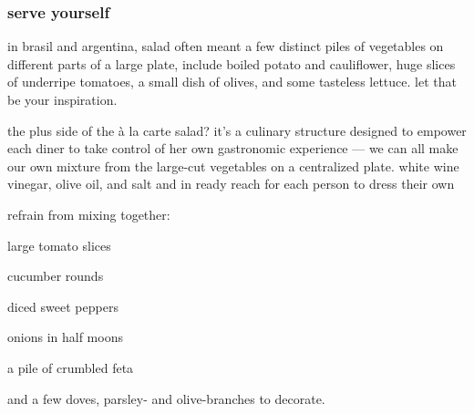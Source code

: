 \subsubsection{serve yourself}

in brasil and argentina, salad often meant a few distinct piles of vegetables 
on different parts of a large plate, include boiled potato and cauliflower, 
huge slices of underripe tomatoes, a small dish of olives, and some tasteless 
lettuce. let that be your inspiration.

the plus side of the \`{a} la carte salad? it's a culinary structure designed 
to empower each diner to take control of her own gastronomic experience --- we 
can all make our own mixture from the large-cut vegetables on a centralized 
plate. white wine vinegar, olive oil, and salt and in ready reach for each 
person to dress their own

refrain from mixing together:

\begin{ingredients}
  \item large tomato slices
  \item cucumber rounds
  \item diced sweet peppers
  \item onions in half moons
  \item a pile of crumbled feta
\end{ingredients}

and a few doves, parsley- and olive-branches to decorate.
